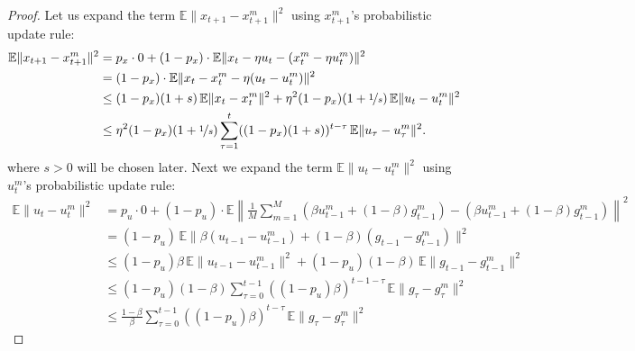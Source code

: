 \begin{proof}
Let us expand the term $\mathbb{E}\|x_{t+1}-x_{t+1}^m\|^2$ using $x_{t+1}^m$'s probabilistic update rule:
\begin{align*}
\mathbb{E}\|x_{t+1}-x_{t+1}^m\|^2
&= p_x \cdot 0 + (1-p_x)\cdot\mathbb{E}\|x_t - \eta u_t - (x_t^m - \eta u_t^m)\|^2 \\
&= (1-p_x)\cdot\mathbb{E}\|x_t - x_t^m - \eta(u_t - u_t^m)\|^2 \\
&\leq (1-p_x)(1+s)\,\mathbb{E}\|x_t - x_t^m\|^2 + \eta^2(1-p_x)(1+\nicefrac{1}{s})\,\mathbb{E}\|u_t - u_t^m\|^2 \\
&\leq \eta^2(1-p_x)(1+\nicefrac{1}{s})\sum_{\tau=1}^{t}((1-p_x)(1+s))^{t-\tau}\,\mathbb{E}\|u_\tau - u_\tau^m\|^2.
\end{align*}
where $s > 0$ will be chosen later. Next we expand the term $\mathbb{E}\|u_t - u_t^m\|^2$ using $u_t^m$'s probabilistic update rule:
\begin{align*}
\mathbb{E}\|u_t - u_t^m\|^2
&= p_u \cdot 0 + (1-p_u)\cdot\mathbb{E}\left\|\frac{1}{M}\sum_{m=1}^{M}(\beta u_{t-1}^m + (1-\beta)g_{t-1}^m) - (\beta u_{t-1}^m + (1-\beta)g_{t-1}^m)\right\|^2 \\
&= (1-p_u)\,\mathbb{E}\|\beta(u_{t-1}-u_{t-1}^m) + (1-\beta)(g_{t-1}-g_{t-1}^m)\|^2 \\
&\leq (1-p_u)\beta\,\mathbb{E}\|u_{t-1}-u_{t-1}^m\|^2 + (1-p_u)(1-\beta)\,\mathbb{E}\|g_{t-1}-g_{t-1}^m\|^2 \\
&\leq (1-p_u)(1-\beta)\sum_{\tau=0}^{t-1}((1-p_u)\beta)^{t-1-\tau}\,\mathbb{E}\|g_\tau - g_\tau^m\|^2 \\
&\leq \frac{1-\beta}{\beta}\sum_{\tau=0}^{t-1}((1-p_u)\beta)^{t-\tau}\,\mathbb{E}\|g_\tau - g_\tau^m\|^2
\end{align*}


\end{proof}
